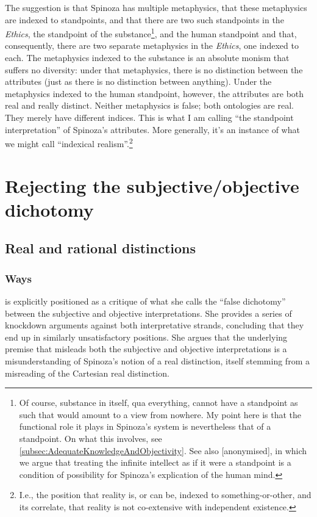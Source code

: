 \documentclass[11pt]{article}
\newcommand{\dash}{\unskip{---}}
\newcommand\texttitle[1]{\emph{#1}}
\begin{document}
	The suggestion is that Spinoza has multiple metaphysics, that these metaphysics are indexed to standpoints, and that there are two such standpoints in the \texttitle{Ethics}, the standpoint of the substance\footnote{Of course, substance in itself, qua everything, cannot have a standpoint as such \dash that would amount to a view from nowhere. My point here is that the functional role it plays in Spinoza's system is nevertheless that of a standpoint. On what this involves, see \autoref{subsec:AdequateKnowledgeAndObjectivity}. See also [anonymised], in which we argue that treating the infinite intellect as if it were a standpoint is a condition of possibility for Spinoza's explication of the human mind.}, and the human standpoint \dash and that, consequently, there are two separate metaphysics in the \texttitle{Ethics}, one indexed to each. The metaphysics indexed to the substance is an absolute monism that suffers no diversity: under that metaphysics, there is no distinction between the attributes (just as there is no distinction between anything). Under the metaphysics indexed to the human standpoint, however, the attributes are both real and really distinct. Neither metaphysics is false; both ontologies are real. They merely have different indices. This is what I am calling \enquote{the standpoint interpretation} of Spinoza's attributes. More generally, it's an instance of what we might call \enquote{indexical realism}.\footnote{I.e., the position that reality is, or can be, indexed to something-or-other, and its correlate, that reality is not co-extensive with independent existence.}
	
	\section{Rejecting the subjective/objective dichotomy} \label{sec:Reject}
	
	\subsection{Real and rational distinctions} \label{subsec:RRDist}
	
	\subsubsection{Ways} \label{subsubsec:Ways}
	
	\cite{Shein2009} is explicitly positioned as a critique of what she calls the \enquote{false dichotomy} between the subjective and objective interpretations. She provides a series of knockdown arguments against both interpretative strands, concluding that they end up in similarly unsatisfactory positions. She argues that the underlying premise that misleads both the subjective and objective interpretations is a misunderstanding of Spinoza’s notion of a real distinction, itself stemming from a misreading of the Cartesian real distinction.
	
\end{document}
